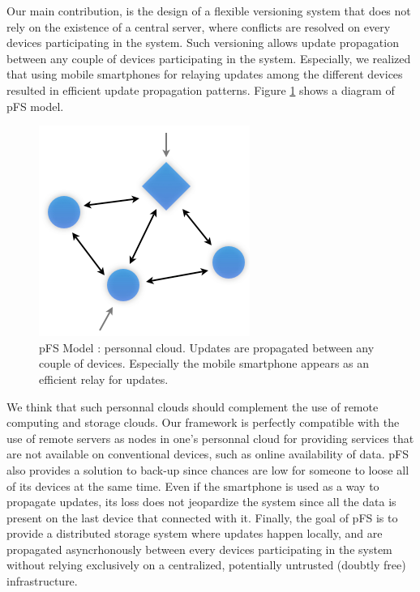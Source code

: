 Our main contribution, is the design of a flexible versioning system
that does not rely on the existence of a central server, where
conflicts are resolved on every devices participating in the
system. Such versioning allows update propagation between any couple
of devices participating in the system. Especially, we realized that
using mobile smartphones for relaying updates among the different
devices resulted in efficient update propagation patterns. Figure
\ref{PfsModel} shows a diagram of pFS model.

\begin{figure}[ht]
\begin{center}
  \includegraphics [scale=0.5] {img/pfs_model}
  \caption{\label{PfsModel} {\small pFS Model : personnal
      cloud. Updates are propagated between any couple of
      devices. Especially the mobile smartphone appears as an
      efficient relay for updates. }}
\end{center}
\end{figure}

We think that such personnal clouds should complement the use of
remote computing and storage clouds. Our framework is perfectly
compatible with the use of remote servers as nodes in one's personnal
cloud for providing services that are not available on conventional
devices, such as online availability of data. pFS also provides a
solution to back-up since chances are low for someone to loose all of
its devices at the same time. Even if the smartphone is used as a way to
propagate updates, its loss does not jeopardize the system since all
the data is present on the last device that connected with
it. Finally, the goal of pFS is to provide a distributed storage
system where updates happen locally, and are propagated asyncrhonously
between every devices participating in the system without relying
exclusively on a centralized, potentially untrusted (doubtly free)
infrastructure.


